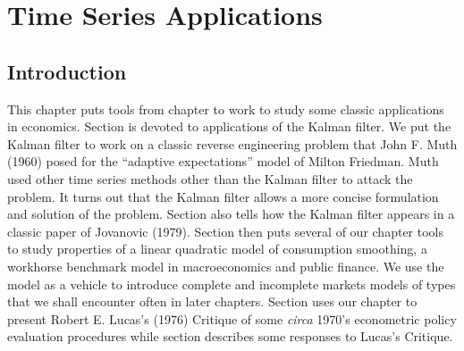 %
%


\chapter{Time Series Applications\label{timeseriesapp}}
\def\toone{{t+1}}
\def\ttwo{{t+2}}
\def\tthree{{t+3}}
\def\Tone{{T+1}}
\def\TTT{{T-1}}
\def\rtr{{\rm tr}}
\def\epigraph#1#2{%
\begingroup
\smallskip
\leftskip=2em
\rightskip=0pt plus2em
\it\noindent #1\par
\noindent --- #2\par
\endgroup\noindent}
%
\def\frac#1#2{#1\over #2}
%


\section{Introduction}

This chapter puts tools from chapter  to work to study some classic applications in
economics.  Section  is devoted to applications of the Kalman filter.  We put the
Kalman filter to work on a  classic reverse engineering problem that John F. Muth (1960)  posed for the ``adaptive expectations''  model of
Milton Friedman.  Muth used other time series methods other than the Kalman filter  to attack the problem.  It turns out that the Kalman
filter allows a more concise formulation and solution of the problem. Section   also tells how the Kalman filter appears in
a classic paper of Jovanovic (1979). Section  then puts several of our chapter   tools to 
study properties of a linear quadratic model of consumption smoothing, a workhorse benchmark model in macroeconomics
and public finance.  We use the model as a vehicle  to introduce complete and incomplete markets models of types that we shall
encounter often in later chapters. Section  uses our chapter  to present Robert E. Lucas's (1976)
Critique of some {\it circa\/} 1970's econometric policy evaluation procedures while section  describes some  responses
to  Lucas's Critique.
%
%
%
%


